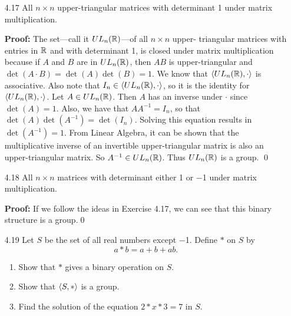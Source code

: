 \begin{enumerate}
		\textbf{Proof:} It can easily be shown that this is a group. To show
      closure under addition is trivial. Associativity is also trivial. $0_n$
      is the identity for this binary structure. Negating the numbers in an
      upper-triangular matrix will give us its additive inverse. \qed
   \item[4.17] All $n \times n$ upper-triangular matrices with determinant 1 
               under matrix multiplication.
	
		\textbf{Proof:} The set---call it $UL_n(\mathbb{R})$---of all $n \times n$ upper-
      triangular matrices with entries in $\mathbb{R}$ and with determinant 1,  is 
      closed under matrix multiplication because if $A$ and $B$  are in
      $UL_n(\mathbb{R})$, then $AB$ is upper-triangular and
      $\det(A \cdot B) = \det(A)\det(B) = 1$. We know that
      $\langle UL_n(\mathbb{R}), \cdot \rangle$ is associative. Also note that
      $I_n \in \langle UL_n(\mathbb{R}), \cdot \rangle$, so it is the identity for
      $\langle UL_n(\mathbb{R}), \cdot \rangle$. Let $A \in UL_n(\mathbb{R})$. Then $A$ has an inverse 
      under $\cdot$ since $\det(A) = 1$. Also, we have that $AA^{-1} = I_n$, so 
      that $\det(A)\det(A^{-1}) = \det(I_n)$. Solving this equation results in
      $\det(A^{-1}) = 1$. From Linear Algebra, it can be shown that the
      multiplicative inverse of an invertible upper-triangular matrix is also
      an upper-triangular matrix. So $A^{-1} \in UL_n(\mathbb{R})$. Thus $UL_n(\mathbb{R})$ is
      a group. \qed
   \item[4.18] All $n \times n$ matrices with determinant either 1 or $-$1 under
               matrix multiplication.
	
		\textbf{Proof:} If we follow the ideas in Exercise 4.17, we can see that
      this binary structure is a group.\qed
   \item[4.19] Let $S$ be the set of all real numbers except $-$1. Define $*$ on
					$S$ by $$a * b = a + b + ab.$$
      \begin{enumerate}
         \item Show that $*$ gives a binary operation on $S$.
         \item Show that $\langle S, * \rangle$ is a group.
         \item Find the solution of the equation $2 * x * 3 = 7$ in $S$.
      \end{enumerate}
	

\end{enumerate}
